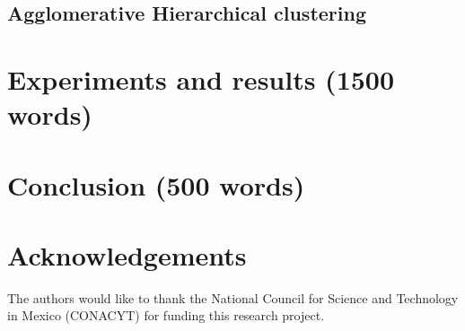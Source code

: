 \documentclass[pdftex,11pt,a4paper]{article}
\theoremstyle{definition}
\theoremstyle{remark}
\begin{document}
\subsection{Agglomerative Hierarchical clustering}

\section{Experiments and results (1500 words)}
\label{section_results}

\section{Conclusion (500 words)}
\label{section_conclusion}
\blindtext

\section*{Acknowledgements}


The authors would like to thank the National Council for Science and Technology in Mexico (CONACYT) for funding this research project.




\end{document}
